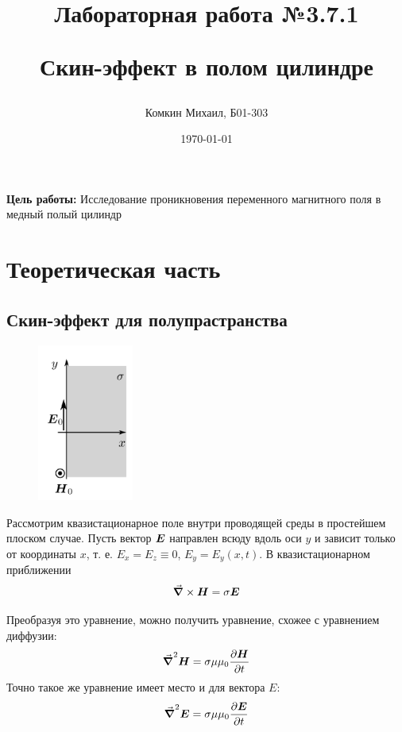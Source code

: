 \documentclass[a4paper, 12pt]{article}
\title{\begin{center}Лабораторная работа №3.7.1\end{center}
	Скин-эффект в полом цилиндре}
\author{Комкин Михаил, Б01-303}
\date{\today}
\begin{document}
	\maketitle
	\textbf{Цель работы:} Исследование проникновения переменного магнитного поля в медный полый цилиндр
	
	\section*{Теоретическая часть}
	\subsection*{Скин-эффект для полупрастранства}
	\vspace{1cm}
	\begin{figure}
		\begin{center}
			\includegraphics[width=0.28\textwidth]{image}
		\end{center}
	\end{figure}
	
	Рассмотрим квазистационарное поле внутри проводящей среды в простейшем плоском случае.
	Пусть вектор $\vb*{E}$ направлен всюду вдоль оси $y$ и зависит только от координаты $x$, т. е. ${E_x} = {E_z} \equiv 0$, $E_y=E_y(x,t)$.
	В квазистационарном приближении 
	\begin{equation*}
		\grad \times \vb*{H} = \sigma \vb*{E}
	\end{equation*}
	
	Преобразуя это уравнение, можно получить уравнение, схожее с уравнением диффузии:
	\begin{equation}
		\grad^2\vb*{H}=\sigma\mu\mu_0 \frac{\partial \vb*{H}}{\partial t}\label{eq:laplacian_H}
	\end{equation}
	Точно такое же уравнение имеет место и для вектора $E:$
	\begin{equation}
		\grad^2\vb*{E}=\sigma\mu\mu_0 \frac{\partial \vb*{E}}{\partial t}\label{eq:diffusion}
	\end{equation}
	
\end{document}
